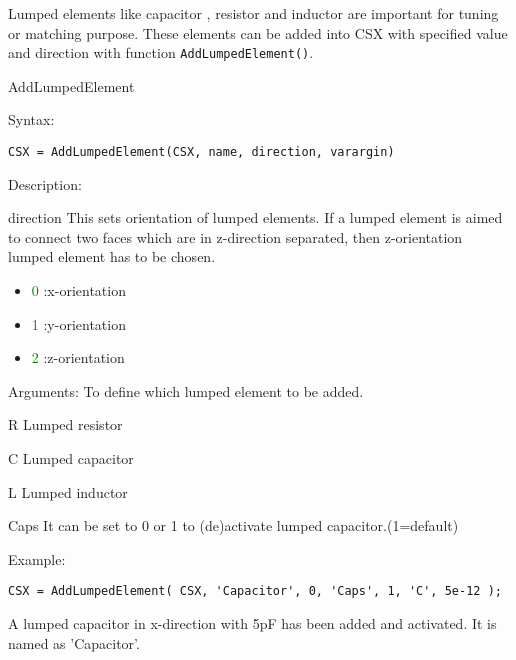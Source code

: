 Lumped elements like capacitor , resistor and inductor are important for tuning or matching purpose. These elements can be added into CSX with specified value and direction with function \texttt{AddLumpedElement()}. 

\begin{FontNameFunct}{AddLumpedElement}
\end{FontNameFunct}


\begin{FontDescr}{Syntax:}
  \begin{lstlisting}
CSX = AddLumpedElement(CSX, name, direction, varargin)
  \end{lstlisting}
 \end{FontDescr} 
 
\begin{FontDescr}{Description:}
\begin{FontPara}{direction}
This sets orientation of lumped elements. If a lumped element is aimed to connect two faces which are in z-direction separated, then z-orientation lumped element has to be chosen. 
 \begin{itemize}
 \item \textcolor{green}{0} :x-orientation 
 \item \textcolor{green}{1} :y-orientation
 \item \textcolor{green}{2} :z-orientation
 \end{itemize}
 \end{FontPara}
\end{FontDescr}

  
\begin{FontDescr}{Arguments:} 
 To define which lumped element to be added. 
 
 \begin{FontPara}{R}
 Lumped resistor
 \end{FontPara}
 \begin{FontPara}{C}
 Lumped capacitor
 \end{FontPara}
 \begin{FontPara}{L}
 Lumped inductor
 \end{FontPara}
 \begin{FontPara}{Caps}
It can be set to 0 or 1 to (de)activate lumped capacitor.(1=default) 
 \end{FontPara}               
 
\end{FontDescr}
 
 
\begin{FontDescr}{Example:}

\begin{lstlisting} 
CSX = AddLumpedElement( CSX, 'Capacitor', 0, 'Caps', 1, 'C', 5e-12 );
\end{lstlisting}
 A lumped capacitor in x-direction with 5pF has been added and activated. It is named as 'Capacitor'. 
\end{FontDescr}